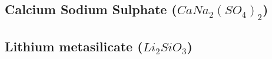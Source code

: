 \documentclass[../../Report.tex]{subfiles}
\begin{document}
    \subsection{\large Calcium Sodium Sulphate ($CaNa_2{(SO_4)}_2$)}
        

    \subsection{\large Lithium metasilicate ($Li_2SiO_3$)}
        
\end{document}
